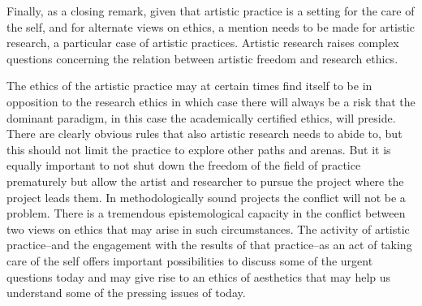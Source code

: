\documentclass[11pt]{article}
\begin{document}
Finally, as a closing remark, given that artistic practice is a setting for the care of the self, and for alternate views on ethics, a mention needs to be made for artistic research, a particular case of artistic practices. Artistic research raises complex questions concerning the relation between artistic freedom and research ethics.

The ethics of the artistic practice may at certain times find itself to be in opposition to the research ethics in which case there will always be a risk that the dominant paradigm, in this case the academically certified ethics, will preside. There are clearly obvious rules that also artistic research needs to abide to, but this should not limit the practice to explore other paths and arenas. But it is equally important to not shut down the freedom of the field of practice prematurely but allow the artist and researcher to pursue the project where the project leads them. In methodologically sound projects the conflict will not be a problem. There is a tremendous epistemological capacity in the conflict between two views on ethics that may arise in such circumstances. The activity of artistic practice--and the engagement with the results of that practice--as an act of taking care of the self offers important possibilities to discuss some of the urgent questions today and may give rise to an ethics of aesthetics that may help us understand some of the pressing issues of today.
\end{document}
